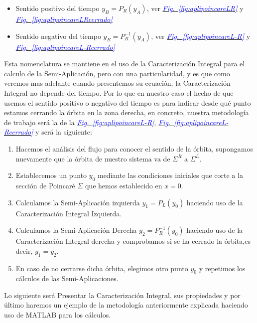 \documentclass[12pt,a4paper]{report} %
\newcommand{\fref}[1]{\hyperref[#1]{\textcolor{blue}{\textit{Fig.~\ref*{#1}}}}}
\begin{document}
	\begin{itemize}
		\item Sentido positivo del tiempo $y_B=P_R(y_A)$, ver \fref{fig:aplipoincareLR} y \fref{fig:aplipoincareLRcerrado}
		\item Sentido negativo del tiempo $y_B=P_R^{-1}(y_A)$, ver \fref{fig:aplipoincareL-R} y \fref{fig:aplipoincareL-Rcerrado}
	\end{itemize}
	
	\noindent Esta nomenclatura se mantiene en el uso de la Caracterización Integral para el calculo de la Semi-Aplicación, pero con una particularidad, y es que como veremos mas adelante cuando presentemos su ecuación, la Caracterización Integral no depende del tiempo. Por lo que en nuestro caso el hecho de que usemos el sentido positivo o negativo del tiempo es para indicar desde qué punto estamos cerrando la órbita en la zona derecha, en concreto, nuestra metodología de trabajo será la de la \fref{fig:aplipoincareL-R}, \fref{fig:aplipoincareL-Rcerrado} y será la siguiente:
	
	\begin{enumerate}
		\item Hacemos el análisis del flujo para conocer el sentido de la órbita, supongamos nuevamente que la órbita de nuestro sistema va de $\varSigma^R$ a $\varSigma^L$.
		\item Establecemos un punto $y_0$ mediante las condiciones iniciales que corte a la sección de Poincarè $\varSigma$ que hemos establecido en $x=0$.
		\item Calculamos la Semi-Aplicación izquierda $y_1=P_L(y_0)$ haciendo uso de la Caracterización Integral Izquierda.
		\item Calculamos la Semi-Aplicación Derecha $y_2=P_R^{-1}(y_0)$ haciendo uso de la Caracterización Integral derecha y comprobamos si se ha cerrado la órbita,es decir, $y_1=y_2$.
		\item En caso de no cerrarse dicha órbita, elegimos otro punto $y_0$ y repetimos los cálculos de las Semi-Aplicaciones.
	\end{enumerate}
	
	\vspace{0.5cm}Lo siguiente será Presentar la Caracterización Integral, sus propiedades y por último haremos un ejemplo de la metodología anteriormente explicada haciendo uso de MATLAB para los cálculos.
	
	
	\newpage
	
\end{document}
